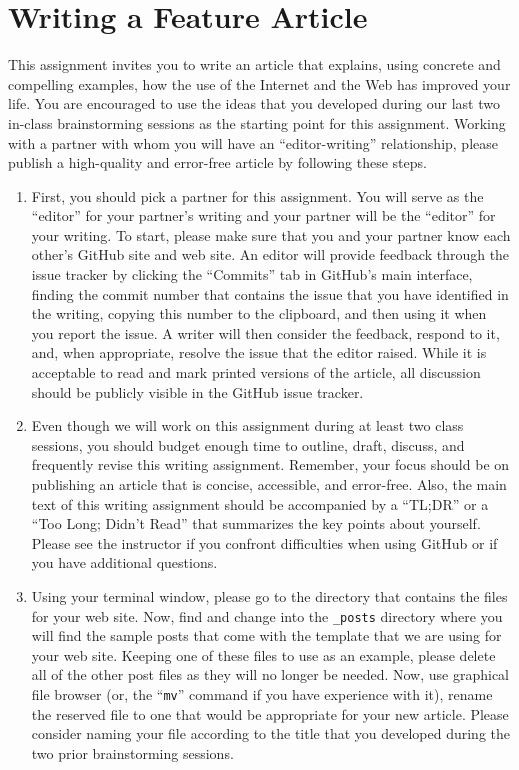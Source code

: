 \section*{Writing a Feature Article}

This assignment invites you to write an article that explains, using concrete and compelling examples, how the use of
the Internet and the Web has improved your life. You are encouraged to use the ideas that you developed during our last
two in-class brainstorming sessions as the starting point for this assignment. Working with a partner with whom you will
have an ``editor-writing'' relationship, please publish a high-quality and error-free article by following these steps.

\begin{enumerate}

  \itemsep 0em

  \item First, you should pick a partner for this assignment. You will serve as the ``editor'' for your partner's
    writing and your partner will be the ``editor'' for your writing. To start, please make sure that you and your
    partner know each other's GitHub site and web site. An editor will provide feedback through the issue tracker by
    clicking the ``Commits'' tab in GitHub's main interface, finding the commit number that contains the issue that you
    have identified in the writing, copying this number to the clipboard, and then using it when you report the issue. A
    writer will then consider the feedback, respond to it, and, when appropriate, resolve the issue that the editor
    raised. While it is acceptable to read and mark printed versions of the article, all discussion should be publicly
    visible in the GitHub issue tracker.

  \item Even though we will work on this assignment during at least two class sessions, you should budget enough time to
    outline, draft, discuss, and frequently revise this writing assignment. Remember, your focus should be on publishing
    an article that is concise, accessible, and error-free. Also, the main text of this writing assignment should be
    accompanied by a ``TL;DR'' or a ``Too Long; Didn't Read'' that summarizes the key points about yourself. Please see
    the instructor if you confront difficulties when using GitHub or if you have additional questions.

  \item Using your terminal window, please go to the directory that contains the files for your web site. Now, find and
    change into the {\tt \_posts} directory where you will find the sample posts that come with the template that we are
    using for your web site. Keeping one of these files to use as an example, please delete all of the other post files
    as they will no longer be needed. Now, use graphical file browser (or, the ``{\tt mv}'' command if you have
    experience with it), rename the reserved file to one that would be appropriate for your new article. Please consider
    naming your file according to the title that you developed during the two prior brainstorming sessions.


\end{enumerate}
